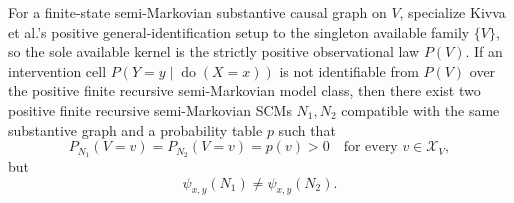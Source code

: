 For a finite-state semi-Markovian substantive causal graph on \(V\), specialize Kivva et al.'s positive general-identification setup to the singleton available family \(\{V\}\), so the sole available kernel is the strictly positive observational law \(P(V)\). If an intervention cell \(P(Y=y\mid\operatorname{do}(X=x))\) is not identifiable from \(P(V)\) over the positive finite recursive semi-Markovian model class, then there exist two positive finite recursive semi-Markovian SCMs \(N_1,N_2\) compatible with the same substantive graph and a probability table \(p\) such that
\[
 P_{N_1}(V=v)=P_{N_2}(V=v)=p(v)>0
 \quad\text{for every }v\in\mathcal X_V,
\]
but
\[
 \psi_{x,y}(N_1)\ne\psi_{x,y}(N_2).
\]